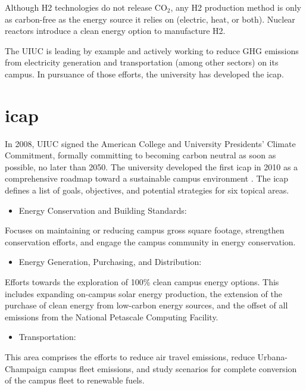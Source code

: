 Although \gls{H2} technologies do not release CO$_2$, any \gls{H2} production method is only as carbon-free as the energy source it relies on (electric, heat, or both).
Nuclear reactors introduce a clean energy option to manufacture \gls{H2}.

The \gls{UIUC} is leading by example and actively working to reduce \gls{GHG} emissions from electricity generation and transportation (among other sectors) on its campus.
In pursuance of those efforts, the university has developed the \gls{icap}.

\section{\gls{icap}}
In 2008, \gls{UIUC} signed the American College and University Presidents' Climate Commitment, formally committing to becoming carbon neutral as soon as possible, no later than 2050.
The university developed the first \gls{icap} in 2010 as a comprehensive roadmap toward a sustainable campus environment \cite{university_of_illinois_at_urbana-champaign_illlinois_2015}.
The \gls{icap} defines a list of goals, objectives, and potential strategies for six topical areas.

\begin{itemize}
	\item Energy Conservation and Building Standards:
\end{itemize}
Focuses on maintaining or reducing campus gross square footage, strengthen conservation efforts, and engage the campus community in energy conservation.

\begin{itemize}
	\item Energy Generation, Purchasing, and Distribution:
\end{itemize}
Efforts towards the exploration of 100\% clean campus energy options.
This includes expanding on-campus solar energy production, the extension of the purchase of clean energy from low-carbon energy sources, and the offset of all emissions from the National Petascale Computing Facility.

\begin{itemize}
	\item Transportation:
\end{itemize}
This area comprises the efforts to reduce air travel emissions, reduce Urbana-Champaign campus fleet emissions, and study scenarios for complete conversion of the campus fleet to renewable fuels.

